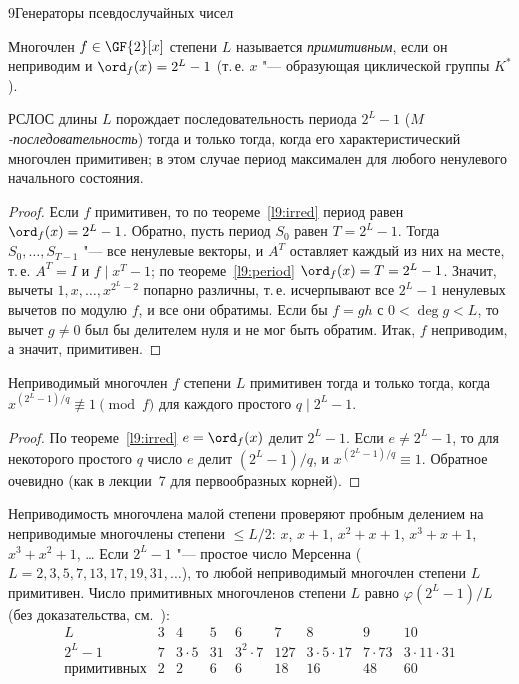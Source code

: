 \begin{lecture}{9}{Генераторы псевдослучайных чисел}
\begin{definition}
Многочлен $f \in \GF{2}[x]$ степени $L$ называется \emph{примитивным}, если он неприводим и
$\ord_f(x) = 2^L - 1$ (т.\,е. $x$ "--- образующая циклической группы $K^*$).
\end{definition}

\begin{theorem}\label{l9:mseq}
РСЛОС длины $L$ порождает последовательность периода $2^L - 1$ (\emph{$M$-последовательность})
тогда и только тогда, когда его характеристический многочлен примитивен; в этом случае период
максимален для любого ненулевого начального состояния.
\end{theorem}

\begin{proof}
Если $f$ примитивен, то по теореме~\ref{l9:irred} период равен $\ord_f(x) = 2^L - 1$.
Обратно, пусть период $S_0$ равен $T = 2^L - 1$. Тогда $S_0, \dots, S_{T-1}$ "--- все ненулевые
векторы, и $A^T$ оставляет каждый из них на месте, т.\,е. $A^T = I$ и $f \mid x^T - 1$; по
теореме~\ref{l9:period} $\ord_f(x) = T = 2^L - 1$. Значит, вычеты $1, x, \dots, x^{2^L - 2}$
попарно различны, т.\,е. исчерпывают все $2^L - 1$ ненулевых вычетов по модулю $f$, и все они
обратимы. Если бы $f = gh$ с $0 < \deg g < L$, то вычет $g \ne 0$ был бы делителем нуля и не мог
быть обратим. Итак, $f$ неприводим, а значит, примитивен.
\end{proof}

\begin{proposition}\label{l9:primcrit}
Неприводимый многочлен $f$ степени $L$ примитивен тогда и только тогда, когда
$x^{(2^L - 1)/q} \not\equiv 1 \pmod f$ для каждого простого $q \mid 2^L - 1$.
\end{proposition}

\begin{proof}
По теореме~\ref{l9:irred} $e = \ord_f(x)$ делит $2^L - 1$. Если $e \ne 2^L - 1$, то для некоторого
простого $q$ число $e$ делит $(2^L - 1)/q$, и $x^{(2^L - 1)/q} \equiv 1$. Обратное очевидно (как в
лекции~7 для первообразных корней).
\end{proof}

Неприводимость многочлена малой степени проверяют пробным делением на неприводимые многочлены
степени $\le L/2$: $x$, $x + 1$, $x^2 + x + 1$, $x^3 + x + 1$, $x^3 + x^2 + 1$, \dots{} Если
$2^L - 1$ "--- простое число Мерсенна ($L = 2, 3, 5, 7, 13, 17, 19, 31, \dots$), то любой
неприводимый многочлен степени $L$ примитивен. Число примитивных многочленов степени $L$ равно
$\varphi(2^L - 1)/L$ (без доказательства, см.~\cite[гл.~3]{lidl-niederreiter}):
\[
\begin{array}{c|cccccccc}
  L & 3 & 4 & 5 & 6 & 7 & 8 & 9 & 10\\ \hline
  2^L - 1 & 7 & 3 \cdot 5 & 31 & 3^2 \cdot 7 & 127 & 3 \cdot 5 \cdot 17 & 7 \cdot 73 & 3 \cdot 11 \cdot 31\\
  \text{примитивных} & 2 & 2 & 6 & 6 & 18 & 16 & 48 & 60
\end{array}
\]


\end{lecture}
